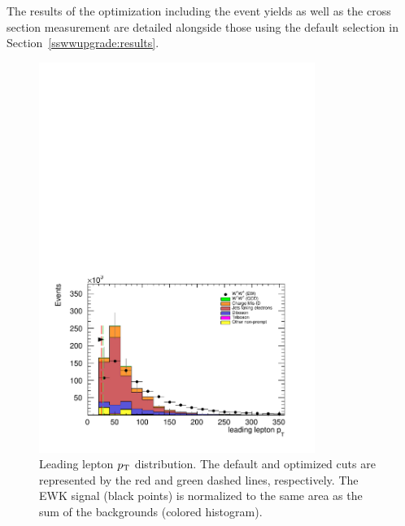 The results of the optimization including the event yields as well as the cross section measurement are detailed alongside those using the default selection in Section~\ref{sswwupgrade:results}.

\begin{figure}[htp]
  \centering
  \includegraphics[width=0.8\textwidth]{figs/ssww_upgrade/optimization_plots/lep0pt}
  \caption{Leading lepton $p_{\mathrm{T}}$ distribution.  The default and optimized cuts are represented by the red and green dashed lines, respectively.  The \ssww EWK signal (black points) is normalized to the same area as the sum of the backgrounds (colored histogram).}
  \label{fig:optimized_lep0pt}
\end{figure}

